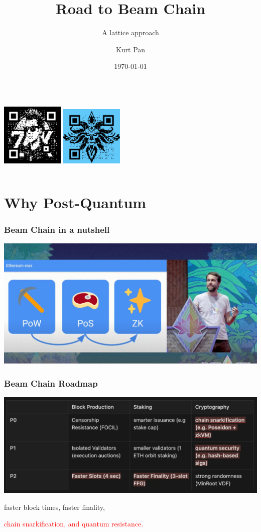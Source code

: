 \documentclass{beamer}
\title{Road to Beam Chain}
\subtitle{A lattice approach}
\author{Kurt Pan}
\institute{\url{ZKPunk.pro}}
\date{\today}
\begin{document}
\begin{frame}
	\titlepage 
	\begin{columns}
	\centering
	\includegraphics[width=3cm]{zkpunk-qrcode.png}
    \centering
    \includegraphics[width=3cm]{lazarus-repo.png}
 \end{columns}
\end{frame}

\section{Why Post-Quantum}

\begin{frame}
\frametitle{Beam Chain in a nutshell}
	\includegraphics[scale=0.25]{beamzk.jpeg}
	
\end{frame}

\begin{frame}
\frametitle{Beam Chain Roadmap}
\includegraphics[scale=0.25]{beamroad.webp}

	faster block times, faster finality,
	
	 \textcolor{red}{chain snarkification, and quantum resistance.}
\end{frame}
\end{document}

